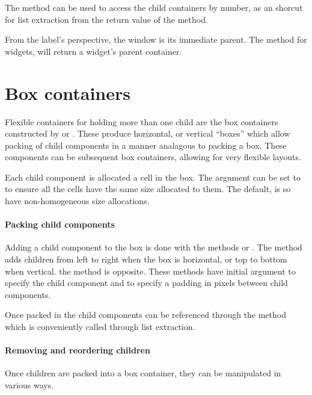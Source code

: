 The \method{[[}{GObject} method 
can be used to access
the child containers by number, as an shorcut for list extraction
from the return value of the  method.

From the label's perspective, the window is its immediate parent. The
 method for \GTK\/ widgets, will return a widget's
parent container.

\section{Box containers}
\label{sec:RGtk2:BoxContainers}

Flexible containers for holding more than one child are the box
containers constructed by  or .
These produce horizontal, or vertical ``boxes'' which allow packing of
child components in a manner analagous to packing a box. These
components can be subsequent box containers, allowing for very
flexible layouts.

Each child component is allocated a cell in the box.  The
 argument can be set to  to
ensure all the cells have the same size allocated to them. The
default, is so have non-homogeneous size allocations. 

\paragraph{Packing child components}
Adding a child component to the box is done with the methods
 or . The
 method adds children from left to right
when the box is horizontal, or top to bottom when vertical. the
 method is opposite. These methods have initial argument
 to specify the child component and  to specify a padding in pixels between child components. 


Once packed in the child components can be referenced through the  method which is conveniently called through list extraction.


\paragraph{Removing and reordering children}
Once children are packed into a box container, they can be manipulated
in various ways.

